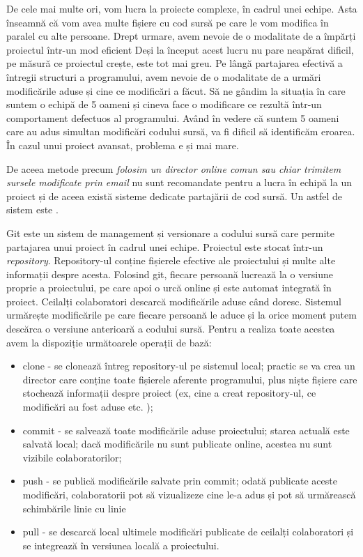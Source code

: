 De cele mai multe ori, vom lucra la proiecte complexe, în cadrul unei echipe.
Asta înseamnă că vom avea multe fișiere cu cod sursă pe care le vom modifica în
paralel cu alte persoane. Drept urmare, avem nevoie de o modalitate de a împărți
proiectul într-un mod eficient Deși la început acest lucru nu pare neapărat
dificil, pe măsură ce proiectul crește, este tot mai greu. Pe lângă partajarea
efectivă a întregii structuri a programului, avem nevoie de o modalitate de a
urmări modificările aduse și cine ce modificări a făcut. Să ne gândim la
situația în care suntem o echipă de 5 oameni și cineva face o modificare ce
rezultă într-un comportament defectuos al programului. Având în vedere că suntem
5 oameni care au adus simultan modificări codului sursă, va fi dificil să
identificăm eroarea. În cazul unui proiect avansat, problema e și mai mare.

De aceea metode precum \textit{folosim un director online comun sau chiar
trimitem sursele modificate prin email} nu sunt recomandate pentru a lucra în
echipă la un proiect și de aceea există sisteme dedicate partajării de cod
sursă. Un astfel de sistem este .

Git este un sistem de management și versionare a codului sursă care permite
partajarea unui proiect în cadrul unei echipe. Proiectul este stocat într-un
\textit{repository}. Repository-ul conține fișierele efective ale proiectului și
multe alte informații despre acesta. Folosind git, fiecare persoană lucrează la
o versiune proprie a proiectului, pe care apoi o urcă online și este automat
integrată în proiect. Ceilalți colaboratori descarcă modificările aduse când
doresc. Sistemul urmărește modificările pe care fiecare persoană le aduce și la
orice moment putem descărca o versiune anterioară a codului sursă. Pentru a
realiza toate acestea avem la dispoziție următoarele operații de bază:

\begin{itemize}
	\item clone - se clonează întreg repository-ul pe sistemul local;
		practic se va crea un director care conține toate fișierele
		aferente programului, plus niște fișiere care stochează
		informații despre proiect (ex, cine a creat repository-ul, ce
		modificări au fost aduse etc. );
	\item commit - se salvează toate modificările aduse proiectului; starea
		actuală este salvată local; dacă modificările nu sunt publicate
		online, acestea nu sunt vizibile colaboratorilor;
	\item push - se publică modificările salvate prin commit; odată
		publicate aceste modificări, colaboratorii pot să vizualizeze
		cine le-a adus și pot să urmărească schimbările linie cu linie
	\item pull - se descarcă local ultimele modificări publicate de ceilalți
		colaboratori și se integrează în versiunea locală a proiectului.
\end{itemize}

